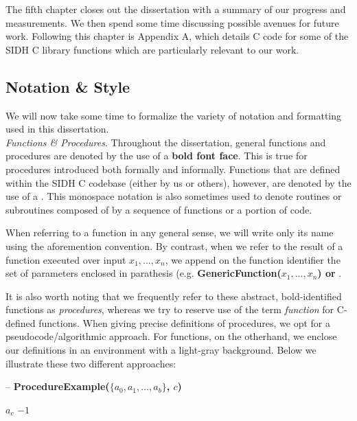 The fifth chapter closes out the dissertation with a summary of our progress and measurements. We then spend some time discussing possible avenues for future work. Following this chapter is Appendix A, which details C code for some of the SIDH C library functions which are particularly relevant to our work.

\subsection{Notation \& Style}

We will now take some time to formalize the variety of notation and formatting used in this dissertation.\\

\noindent
\textit{Functions \& Procedures}. Throughout the dissertation, general functions and procedures are denoted by the use of a \textbf{bold font face}. This is true for procedures introduced both formally and informally. Functions that are defined within the SIDH C codebase (either by us or others), however, are denoted by the use of a . This monospace notation is also sometimes used to denote routines or subroutines composed of by a sequence of functions or a portion of code. 

When referring to a function in any general sense, we will write only its name using the aforemention convention. By contrast, when we refer to the result of a function executed over input $x_{1}, ..., x_{n}$, we append on the function identifier the set of parameters enclosed in parathesis (e.g. \textbf{GenericFunction($x_{1}, ..., x_{n}$) or }. 

It is also worth noting that we frequently refer to these abstract, bold-identified functions as \textit{procedures}, whereas we try to reserve use of the term \textit{function} for C-defined functions. When giving precise definitions of procedures, we opt for a pseudocode/algorithmic approach. For functions, on the otherhand, we enclose our definitions in an environment with a light-gray background. Below we illustrate these two different approaches:\\

\begin{algorithm}
\caption{-- \textbf{ProcedureExample($\{a_0, a_1, ... , a_b\}$, $c$)}}\label{alg:procedureexample}
\begin{algorithmic}[1]
	\State \Return $a_c$
\Else
	\State \Return $-1$
\EndIf
\end{algorithmic}
\end{algorithm}

